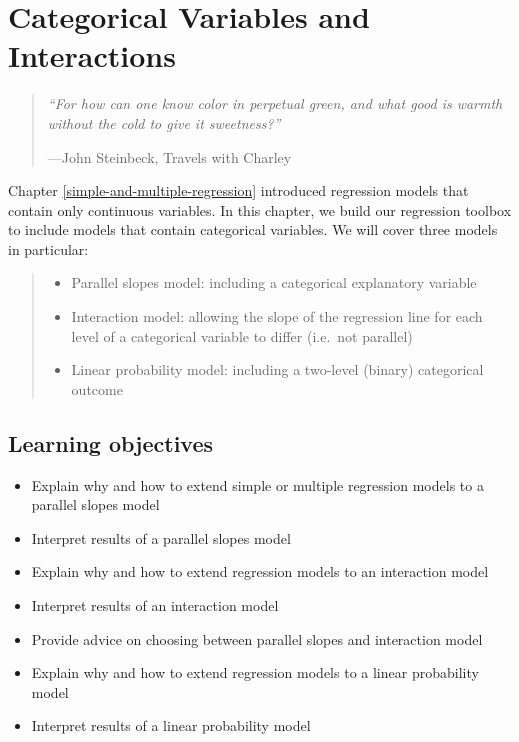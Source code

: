 \documentclass[
]{book}
\providecommand{\tightlist}{%
  \setlength{\itemsep}{0pt}\setlength{\parskip}{0pt}}
\begin{document}
\hypertarget{categorical-variables-and-interactions}{%
\chapter{Categorical Variables and Interactions}\label{categorical-variables-and-interactions}}

\begin{quote}
\emph{``For how can one know color in perpetual green, and what good is warmth without the cold to give it sweetness?''}

---John Steinbeck, Travels with Charley
\end{quote}

Chapter \ref{simple-and-multiple-regression} introduced regression models that contain only continuous variables. In this chapter, we build our regression toolbox to include models that contain categorical variables. We will cover three models in particular:

\begin{quote}
\begin{itemize}
\tightlist
\item
  Parallel slopes model: including a categorical explanatory variable
\item
  Interaction model: allowing the slope of the regression line for each level of a categorical variable to differ (i.e.~not parallel)
\item
  Linear probability model: including a two-level (binary) categorical outcome
\end{itemize}
\end{quote}

\hypertarget{lo7}{%
\section{Learning objectives}\label{lo7}}

\begin{itemize}
\tightlist
\item
  Explain why and how to extend simple or multiple regression models to a parallel slopes model
\item
  Interpret results of a parallel slopes model
\item
  Explain why and how to extend regression models to an interaction model
\item
  Interpret results of an interaction model
\item
  Provide advice on choosing between parallel slopes and interaction model
\item
  Explain why and how to extend regression models to a linear probability model
\item
  Interpret results of a linear probability model
\end{itemize}
\end{document}
